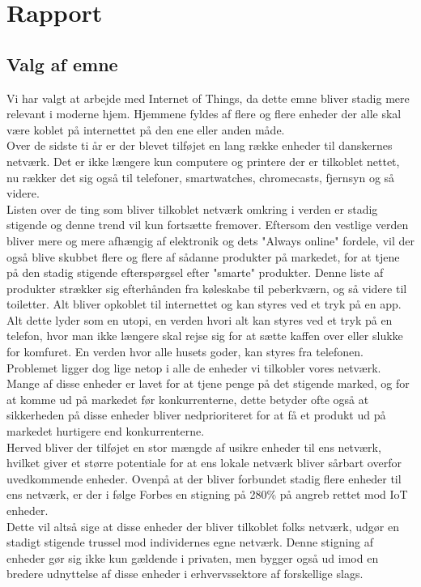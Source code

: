 
\chapter{Rapport}

    \section{Valg af emne}
    
    Vi har valgt at arbejde med Internet of Things, da dette emne bliver stadig mere relevant i moderne hjem. Hjemmene fyldes af flere og flere enheder der alle skal være koblet på internettet på den ene eller anden måde.\autocite{website:Statistica2015}\\
    Over de sidste ti år er der blevet tilføjet en lang række enheder til danskernes netværk. Det er ikke længere kun computere og printere der er tilkoblet nettet, nu rækker det sig også til telefoner, smartwatches, chromecasts, fjernsyn og så videre. \\
    Listen over de ting som bliver tilkoblet netværk omkring i verden er stadig stigende og denne trend vil kun fortsætte fremover. Eftersom den vestlige verden bliver mere og mere afhængig af elektronik og dets "Always online" fordele, vil der også blive skubbet flere og flere af sådanne produkter på markedet, for at tjene på den stadig stigende efterspørgsel efter "smarte" produkter. Denne liste af produkter strækker sig efterhånden fra køleskabe til peberkværn, og så videre til toiletter. Alt bliver opkoblet til internettet og kan styres ved et tryk på en app. Alt dette lyder som en utopi, en verden hvori alt kan styres ved et tryk på en telefon, hvor man ikke længere skal rejse sig for at sætte kaffen over eller slukke for komfuret. En verden hvor alle husets goder, kan styres fra telefonen.\\
    Problemet ligger dog lige netop i alle de enheder vi tilkobler vores netværk. Mange af disse enheder er lavet for at tjene penge på det stigende marked, og for at komme ud på markedet før konkurrenterne, dette betyder ofte også at sikkerheden på disse enheder bliver nedprioriteret for at få et produkt ud på markedet hurtigere end konkurrenterne.\\
    Herved bliver der tilføjet en stor mængde af usikre enheder til ens netværk, hvilket giver et større potentiale for at ens lokale netværk bliver sårbart overfor uvedkommende enheder. Ovenpå at der bliver forbundet stadig flere enheder til ens netværk, er der i følge Forbes en stigning på 280\% på angreb rettet mod IoT enheder.\autocite{Forbes2018}\\
    Dette vil altså sige at disse enheder der bliver tilkoblet folks netværk, udgør en stadigt stigende trussel mod individernes egne netværk. Denne stigning af enheder gør sig ikke kun gældende i privaten, men bygger også ud imod en bredere udnyttelse af disse enheder i erhvervssektore af forskellige slags.
    
